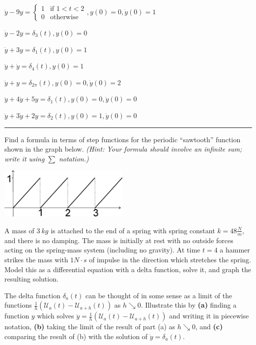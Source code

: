 {{{{\begin{multicols}{2}
\ap $\ddot{y} - 9y = \begin{cases} 1 & \mbox{if } 1 < t < 2 \\ 0 & \mbox{otherwise} \end{cases}, y(0)=0, \dot{y}(0) = 1$

\ap $\dot{y} - 2y = \delta_3(t), y(0)=0$

\ap $\dot{y} + 3y = \delta_1(t), y(0)=1$

\ap $\ddot{y} + \dot{y} = \delta_4(t), y(0)=1$

\ap $\ddot{y} + y = \delta_{2\pi} (t), y(0)=0, \dot{y}(0)=2$

\ap $\ddot{y} + 4 \dot{y} + 5y = \delta_1(t), y(0)=0, \dot{y}(0)=0$

\ap $\ddot{y} + 3\dot{y} + 2y = \delta_2(t), y(0)=1, \dot{y}(0)=0$

\smallskip
\hrule



\smallskip
\ap Find a formula in terms of step functions for the periodic ``sawtooth'' function shown in the graph below.  {\it (Hint: Your formula should involve an infinite sum; write it using $\sum$ notation.)}

\begin{center}
\includegraphics[width=2.5in]{11-laplaceII/sawtooth1.eps}
\end{center}


\ap A mass of $3 \ kg$ is attached to the end of a spring with spring constant $k=48 \frac{N}{m}$, and there is no damping.  The mass is initially at rest with no outside forces acting on the spring-mass system (including no gravity).  At time $t=4$ a hammer strikes the mass with $1 N \cdot s$ of impulse in the direction which stretches the spring.  Model this as a differential equation with a delta function, solve it, and graph the resulting solution.



\ap The delta function $\delta_a(t)$ can be thought of in some sense as a limit of the functions $\frac{1}{h} \left( \mathcal{U}_a(t)-\mathcal{U}_{a+h} (t) \right)$ as $h \searrow 0$. Illustrate this by {\bf (a)} finding a function $y$ which solves $\ddot{y} = \frac{1}{h} \left( \mathcal{U}_a(t)-\mathcal{U}_{a+h} (t) \right)$ and writing it in piecewise notation, {\bf (b)} taking the limit of the result of part (a) as $h \searrow 0$, and {\bf (c)} comparing the result of (b) with the solution of $\ddot{y} = \delta_a(t)$.


\end{multicols}}}}}
